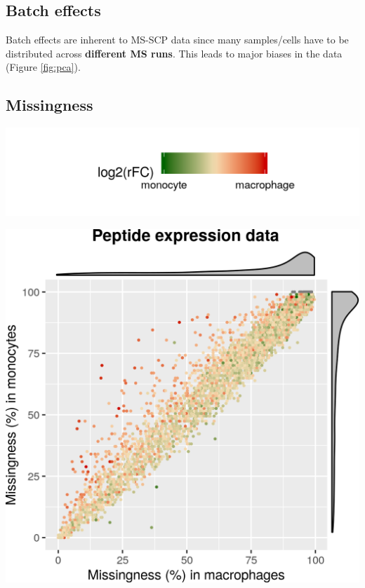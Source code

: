 \documentclass{article}
\begin{document}
\noindent
\begin{minipage}[h]{0.35\linewidth}
  \subsection*{Batch effects}
  \large
  Batch effects are inherent to MS-SCP data since many samples/cells have to be distributed across \textbf{different MS runs}. This leads to major biases in the data (Figure \ref{fig:pca}).
  \subsection*{Missingness}
  \label{fig:missing}
  \begin{center}
  \end{center}
\end{minipage}
\hspace{0.4cm}
\begin{minipage}[h]{0.6\linewidth}
  \begin{center}
  \includegraphics[width=0.5\linewidth, trim={10cm 3cm 7cm 0},clip]{figs/missing-leg.png}
  \end{center}
  \includegraphics[width=\linewidth, trim={0 2cm 0 2cm}]{figs/missing.png}
\end{minipage}
\end{document}
